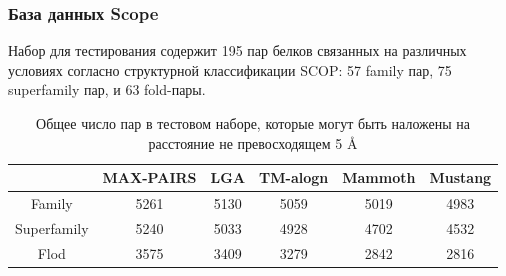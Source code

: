 \documentclass{beamer}
\newcommand{\angstrom}{\textup{\AA}}
\begin{document}
\begin{frame}
\frametitle{База данных Scope}
Набор для тестирования содержит 195 пар белков связанных на различных условиях согласно структурной классификации SCOP: 57 family пар, 75 superfamily пар, и 63 fold-пары.\\
\begin{table}[H]
\caption{ Общее число пар в тестовом наборе, которые могут быть наложены на расстояние не превосходящем 5 \angstrom}
\begin{center}
\begin{tabular}{|c|ccccc|}
\hline
& MAX-PAIRS & LGA & TM-alogn & Mammoth & Mustang\\
\hline
Family & 5261 & 5130 & 5059 & 5019 & 4983\\
Superfamily & 5240 & 5033 & 4928 & 4702 & 4532\\
Flod & 3575 & 3409 & 3279 & 2842 & 2816\\
\hline
\end{tabular}
\end{center}
\end{table}
\end{frame}
\end{document}
